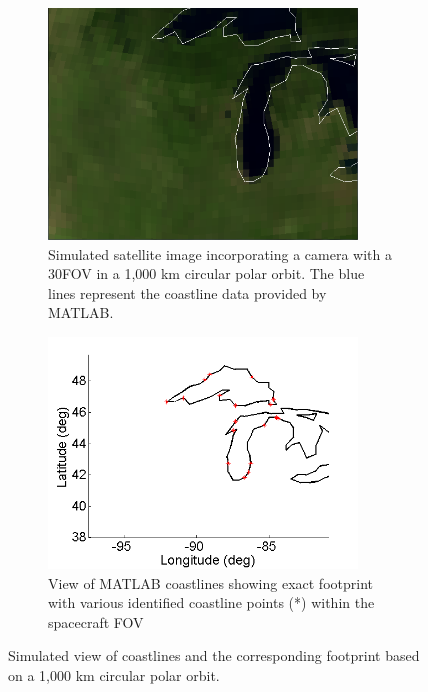 \documentclass[]{aiaa-tc}%
\begin{document}
\begin{figure}[h!]
\centering
\begin{subfigure}{.48\textwidth}
  \centering
  \includegraphics[width=0.9\textwidth]{Michigan_sat}
  \caption{Simulated satellite image incorporating a camera with a 30\degree FOV in a 1,000 km circular polar orbit.  The blue lines represent the coastline data provided by MATLAB.}
  \label{fig:satellite}
\end{subfigure}\hfill
\begin{subfigure}{.48\textwidth} 
  \centering
  \includegraphics[width=0.9\textwidth]{Michigan}
  \caption{View of MATLAB coastlines showing exact footprint with various identified coastline points (*) within the spacecraft FOV}
  \label{fig:coastline}
\end{subfigure}
\caption{Simulated view of coastlines and the corresponding footprint based on a 1,000 km circular polar orbit.}
\label{fig:matlabstuff}
\end{figure}
%
%
%
\end{document}
